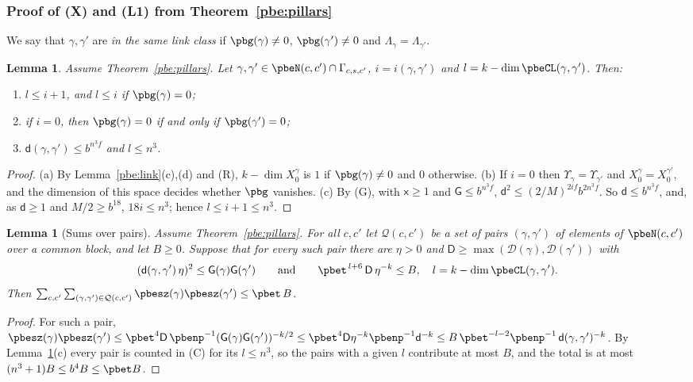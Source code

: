 \documentclass[10pt]{amsart}
\newtheorem{lemma}[theorem]{Lemma}
\theoremstyle{definition}
\theoremstyle{remark}
\begin{document}
\subsubsection{Proof of \textup{(X)} and \textup{(L1)} from Theorem~\ref{pbe:pillars}}\label{pbe:ss-XL1}

We say that $\gamma,\gamma'$ are \emph{in the same link class} if $\pbg(\gamma)\ne0$, $\pbg(\gamma')
\ne0$ and $\Lambda_\gamma=\Lambda_{\gamma'}$.

\begin{lemma}\label{pbe:rank}
Assume Theorem~\ref{pbe:pillars}. Let $\gamma,\gamma'\in\pbeN(c,c')\cap\Gamma_{c,s,c'}$, $i=i(\gamma,
\gamma')$ and $l=k-\dim\pbeCL(\gamma,\gamma')$. Then:
\begin{enumerate}
\item[(a)] $l\le i+1$, and $l\le i$ if $\pbg(\gamma)=0$;
\item[(b)] if $i=0$, then $\pbg(\gamma)=0$ if and only if $\pbg(\gamma')=0$;
\item[(c)] $\mathsf d(\gamma,\gamma')\le b^{n^3f}$ and $l\le n^3$.
\end{enumerate}
\end{lemma}
\begin{proof}
(a) By Lemma~\ref{pbe:link}(c),(d) and (R), $k-\dim X_0^\gamma$ is $1$ if $\pbg(\gamma)\ne0$ and $0$
otherwise. (b) If $i=0$ then $\Upsilon_\gamma=\Upsilon_{\gamma'}$ and $X_0^\gamma=X_0^{\gamma'}$, and
the dimension of this space decides whether $\pbg$ vanishes. (c) By (G), with $\mathsf x\ge1$ and
$\mathsf G\le b^{n^3f}$, $\mathsf d^2\le(2/M)^{2if}b^{2n^3f}$. So $\mathsf d\le b^{n^3f}$, and, as
$\mathsf d\ge1$ and $M/2\ge b^{18}$, $18i\le n^3$; hence $l\le i+1\le n^3$.
\end{proof}

\begin{lemma}[Sums over pairs]\label{pbe:pairs}
Assume Theorem~\ref{pbe:pillars}. For all $c,c'$ let $\mathcal Q(c,c')$ be a set of pairs $(\gamma,
\gamma')$ of elements of $\pbeN(c,c')$ over a common block, and let $B\ge0$. Suppose that for every
such pair there are $\eta>0$ and $\mathsf D\ge\max(\mathcal D(\gamma),\mathcal D(\gamma'))$ with
\[
(\mathsf d(\gamma,\gamma')\,\eta)^2\le\mathsf G(\gamma)\mathsf G(\gamma')\qquad\text{and}\qquad\pbet^{\,
l+6}\,\mathsf D\,\eta^{-k}\le B,\quad l=k-\dim\pbeCL(\gamma,\gamma').
\]
Then $\sum_{c,c'}\sum_{(\gamma,\gamma')\in\mathcal Q(c,c')}\pbesz(\gamma)\pbesz(\gamma')\le\pbet\,B$.
\end{lemma}
\begin{proof}
For such a pair, $\pbesz(\gamma)\pbesz(\gamma')\le\pbet^4\mathsf D\,\pbenp^{-1}(\mathsf G(\gamma)
\mathsf G(\gamma'))^{-k/2}\le\pbet^4\mathsf D\eta^{-k}\pbenp^{-1}\mathsf d^{-k}\le B\,\pbet^{-l-2}
\pbenp^{-1}\,\mathsf d(\gamma,\gamma')^{-k}$. By Lemma~\ref{pbe:rank}(c) every pair is counted in (C)
for its $l\le n^3$, so the pairs with a given $l$ contribute at most $B$, and the total is at most
$(n^3+1)B\le b^4B\le\pbet B$.
\end{proof}
\end{document}
